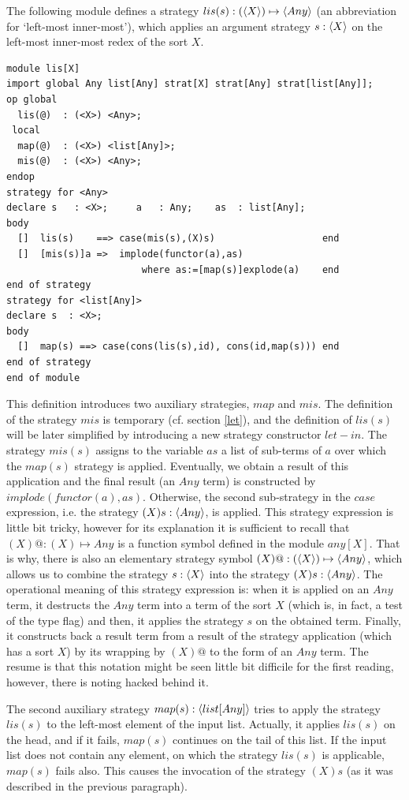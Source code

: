 \documentclass{article}
\begin{document}
{The following module defines a strategy $lis(s) : (\langle X \rangle) \mapsto \langle Any \rangle$
(an abbreviation for `left-most inner-most'), which applies
an argument strategy $s : \langle X \rangle$ on the
left-most inner-most redex of the sort $X$.
%
{\small
\begin{verbatim}
module lis[X]
import global Any list[Any] strat[X] strat[Any] strat[list[Any]];
op global
  lis(@)  : (<X>) <Any>;
 local
  map(@)  : (<X>) <list[Any]>;
  mis(@)  : (<X>) <Any>;
endop
strategy for <Any>
declare s   : <X>;     a   : Any;    as  : list[Any];
body
  []  lis(s)    ==> case(mis(s),(X)s)                   end
  []  [mis(s)]a =>  implode(functor(a),as) 
                        where as:=[map(s)]explode(a)    end
end of strategy
strategy for <list[Any]>
declare s  : <X>;
body
  []  map(s) ==> case(cons(lis(s),id), cons(id,map(s))) end 
end of strategy
end of module
\end{verbatim}}\noindent
%
This definition introduces two auxiliary strategies,
$map$ and $mis$. 
The definition of the strategy $mis$ is temporary 
(cf. section \ref{let}),
and the definition of $lis(s)$ will be later simplified
by introducing a new strategy constructor $let-in$.
The strategy $mis(s)$ assigns to the variable $as$
a  list of sub-terms of $a$ over which the $map(s)$ strategy is
applied. Eventually, we obtain a result of this application and
the final result (an $Any$ term) is constructed by $implode(functor(a),as)$.
Otherwise, the second sub-strategy in the $case$ expression, i.e.
the strategy $(X)s  :  \langle Any \rangle$, is applied.
This strategy expression is little bit tricky, however for its explanation 
it is sufficient
to recall that $(X)@  :  (X) \mapsto Any$ is a function symbol defined in the
module $any[X]$. That is why, there is also an elementary strategy symbol
$(X)@:(\langle X \rangle) \mapsto \langle Any \rangle$, 
which allows us to combine the strategy 
$s:\langle X \rangle$
into 
the strategy
$(X)s  :  \langle Any \rangle$. The operational meaning of this strategy expression is:
when it is applied on an $Any$ term, it destructs the $Any$ term into a term of the 
sort $X$ (which is, in fact, a test of the type flag)
and then, it applies the strategy $s$ on the obtained
term. Finally, it constructs back a result term
from a result of the strategy application 
(which has a sort $X$) by its wrapping by $(X)@$ to the form of an $Any$ term. 
The resume is that this notation might be seen little bit
difficile for the first reading, however, there is noting hacked behind it. 

The second auxiliary strategy $map(s)  :  \langle list[Any] \rangle$ tries to
apply the strategy $lis(s)$ to the left-most element of the input list.
Actually, it applies $lis(s)$ on the head, and if it fails,
$map(s)$ continues on the tail of this list. If the input list does not contain
any element, on which the strategy $lis(s)$ is applicable, $map(s)$
fails also. This causes the invocation of the strategy $(X)s$ (as it was described
in the previous paragraph).

}
\end{document}
